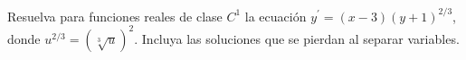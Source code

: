 Resuelva para funciones reales de clase $C^1$ la ecuación $y^{\prime}=(x-3)(y+1)^{2/3}$, donde $u^{2/3}=(\sqrt[3]{u})^2$. Incluya las soluciones que se pierdan al separar variables.
